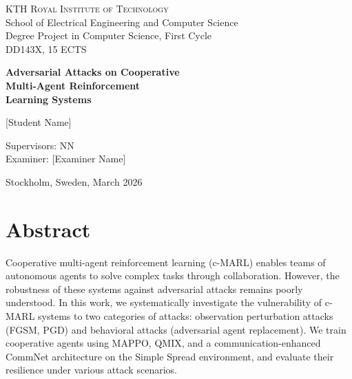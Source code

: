 \documentclass[12pt,a4paper]{article}
\begin{document}
\begin{titlepage}
\centering
\vspace*{2cm}

{\Large\textsc{KTH Royal Institute of Technology}}\\
\vspace{0.3cm}
{\large School of Electrical Engineering and Computer Science}\\
\vspace{0.3cm}
{\normalsize Degree Project in Computer Science, First Cycle}\\
\vspace{0.3cm}
{\normalsize DD143X, 15 ECTS}

\vspace{2.5cm}

{\huge\bfseries Adversarial Attacks on Cooperative\\[0.3cm] Multi-Agent Reinforcement\\[0.3cm] Learning Systems}

\vspace{2cm}

{\Large [Student Name]}

\vspace{1.5cm}

{\large Supervisors: NN}\\
\vspace{0.3cm}
{\large Examiner: [Examiner Name]}

\vspace{\fill}

{\large Stockholm, Sweden, March 2026}
\end{titlepage}

\newpage
\section*{Abstract}

Cooperative multi-agent reinforcement learning (c-MARL) enables teams of autonomous agents to solve complex tasks through collaboration. However, the robustness of these systems against adversarial attacks remains poorly understood. In this work, we systematically investigate the vulnerability of c-MARL systems to two categories of attacks: observation perturbation attacks (FGSM, PGD) and behavioral attacks (adversarial agent replacement). We train cooperative agents using MAPPO, QMIX, and a communication-enhanced CommNet architecture on the Simple Spread environment, and evaluate their resilience under various attack scenarios.
\end{document}
